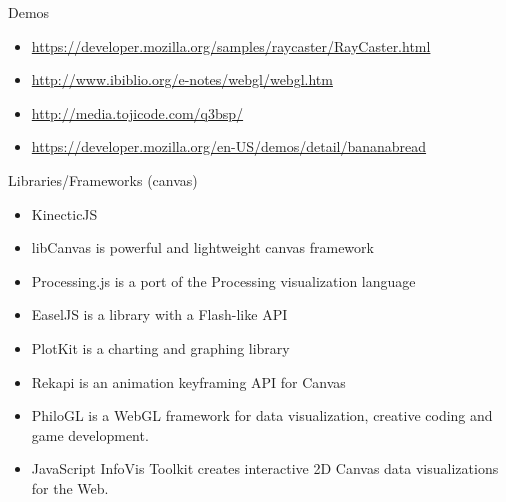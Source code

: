 \documentclass{beamer}
\begin{document}
\begin{frame}{Demos}
\begin{itemize}
\item \url{https://developer.mozilla.org/samples/raycaster/RayCaster.html}
\item \url{http://www.ibiblio.org/e-notes/webgl/webgl.htm}
\item \url{http://media.tojicode.com/q3bsp/}
\item \url{https://developer.mozilla.org/en-US/demos/detail/bananabread}
\end{itemize}

\end{frame}

\begin{frame}{Libraries/Frameworks (canvas)}

\begin{itemize}
\item KinecticJS
\item libCanvas is powerful and lightweight canvas framework
\item Processing.js is a port of the Processing visualization language
\item EaselJS is a library with a Flash-like API
\item PlotKit is a charting and graphing library
\item Rekapi is an animation keyframing API for Canvas
\item PhiloGL is a WebGL framework for data visualization, creative coding and game development.
\item JavaScript InfoVis Toolkit creates interactive 2D Canvas data visualizations for the Web.
\end{itemize}


\end{frame}
\end{document}

